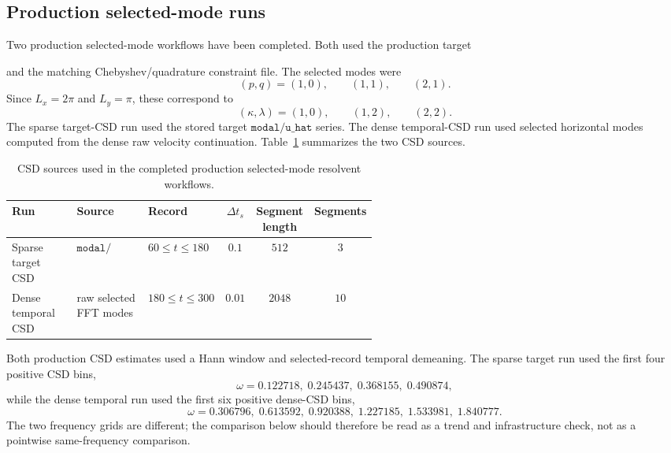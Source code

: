 \documentclass[11pt]{article}
\begin{document}
\subsection{Production selected-mode runs}

Two production selected-mode workflows have been completed. Both used the
production target
\begin{center}
\end{center}
and the matching Chebyshev/quadrature constraint file. The selected modes were
\begin{equation}
  (p,q)=(1,0),\qquad (1,1),\qquad (2,1).
  \label{eq:resolvent_selected_modes}
\end{equation}
Since \(L_x=2\pi\) and \(L_y=\pi\), these correspond to
\[
  (\kappa,\lambda)=(1,0),\qquad (1,2),\qquad (2,2).
\]
The sparse target-CSD run used the stored target \(\texttt{modal/u\_hat}\)
series. The dense temporal-CSD run used selected horizontal modes computed
from the dense raw velocity continuation. Table~\ref{tab:resolvent_csd_sources}
summarizes the two CSD sources.

\begin{table}[H]
  \centering
  \caption{CSD sources used in the completed production selected-mode
  resolvent workflows.}
  \label{tab:resolvent_csd_sources}
  \small
  \begin{tabular}{p{0.18\linewidth}p{0.20\linewidth}p{0.16\linewidth}ccc}
    \toprule
    Run & Source & Record & \(\Delta t_s\) & Segment length & Segments \\
    \midrule
    Sparse target CSD
      & \(\texttt{modal/u\_hat}\)
      & \(60\le t\le180\)
      & \(0.1\)
      & \(512\)
      & \(3\) \\
    Dense temporal CSD
      & raw selected FFT modes
      & \(180\le t\le300\)
      & \(0.01\)
      & \(2048\)
      & \(10\) \\
    \bottomrule
  \end{tabular}
\end{table}

Both production CSD estimates used a Hann window and selected-record temporal
demeaning. The sparse target run used the first four positive CSD bins,
\begin{equation}
  \omega =
  0.122718,\;0.245437,\;0.368155,\;0.490874,
  \label{eq:resolvent_sparse_omega}
\end{equation}
while the dense temporal run used the first six positive dense-CSD bins,
\begin{equation}
  \omega =
  0.306796,\;0.613592,\;0.920388,\;1.227185,\;1.533981,\;1.840777.
  \label{eq:resolvent_dense_omega}
\end{equation}
The two frequency grids are different; the comparison below should therefore
be read as a trend and infrastructure check, not as a pointwise same-frequency
comparison.
\end{document}
